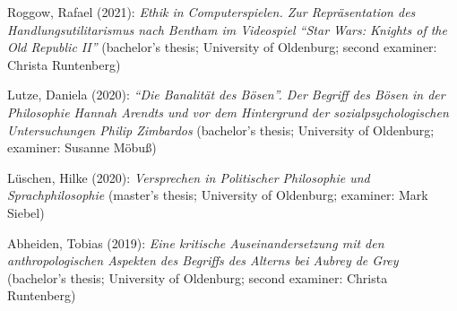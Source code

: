 \documentclass[a4paper,10pt]{article}
\newenvironment{literature}{%
   \parskip6pt\parindent0pt\raggedright
   \def\lititem{\hangindent=1cm\hangafter1}}{%
   \par\ignorespaces}
\begin{document}
\begin{literature}
\lititem Roggow, Rafael (2021): \textit{Ethik in Computerspielen. Zur Repräsentation des Handlungsutilitarismus nach Bentham im Videospiel \enquote{Star Wars: Knights of the Old Republic II}} (bachelor's thesis; University of Oldenburg; second examiner: Christa Runtenberg)

\lititem Lutze, Daniela (2020): \textit{\enquote{Die Banalität des Bösen}. Der Begriff des Bösen in der Philosophie Hannah Arendts und vor dem Hintergrund der sozialpsychologischen Untersuchungen Philip Zimbardos} (bachelor's thesis; University of Oldenburg; examiner: Susanne Möbuß)

\lititem Lüschen, Hilke (2020): \textit{Versprechen in Politischer Philosophie und Sprachphilosophie} (master's thesis; University of Oldenburg; examiner: Mark Siebel)

\lititem Abheiden, Tobias (2019): \textit{Eine kritische Auseinandersetzung mit den anthropologischen Aspekten des Begriffs des Alterns bei Aubrey de Grey} (bachelor's thesis; University of Oldenburg; second examiner: Christa Runtenberg)
\end{literature}


\clearpage
\end{document}
